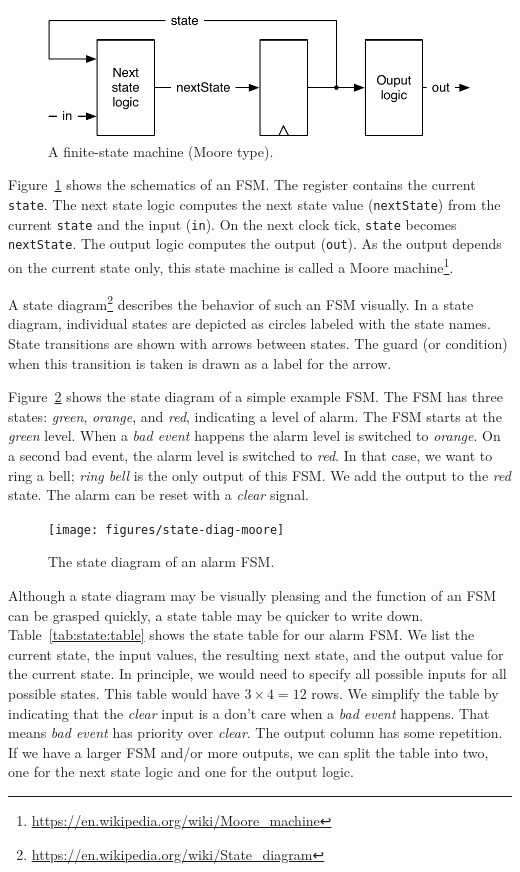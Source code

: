 \documentclass[%
    10pt,
    headinclude, footexclude,
    openright, %
    notitlepage,
    cleardoubleempty,
    headsepline,
    pointlessnumbers,
    bibtotoc, idxtotoc,
    ]{scrbook}
\newcommand{\code}[1]{{\small{\texttt{#1}}}}
\newcommand{\scale}{0.7}
\newcommand{\myref}[2]{\href{#1}{#2}}
\renewcommand{\myref}[2]{{#2}{\footnote{\url{#1}}}}
\begin{document}
\begin{figure}
  \centering
  \includegraphics[scale=\scale]{figures/fsm}
  \caption{A finite-state machine (Moore type).}
  \label{fig:fsm}
\end{figure}

Figure~\ref{fig:fsm} shows the schematics of an FSM. The register contains the current \code{state}.
The next state logic computes the next state value (\code{nextState})
from the current \code{state} and the input (\code{in}).
On the next clock tick, \code{state} becomes \code{nextState}.
The output logic computes the output (\code{out}). As the output depends on the current
state only, this state machine is called a
\myref{https://en.wikipedia.org/wiki/Moore_machine}{Moore machine}.


A \myref{https://en.wikipedia.org/wiki/State_diagram}{state diagram}
describes the behavior of such an FSM visually.
In a state diagram, individual states are depicted as circles labeled
with the state names.
State transitions are shown with arrows between states.
The guard (or condition) when this transition is taken is drawn as a label
for the arrow.

Figure~\ref{fig:diag-moore} shows the state diagram of a simple example FSM.
The FSM has three states: \emph{green}, \emph{orange}, and \emph{red},
indicating a level of alarm. The FSM starts at the \emph{green} level.
When a \emph{bad event} happens the alarm level is switched to \emph{orange}.
On a second bad event, the alarm level is switched to \emph{red}.
In that case, we want to ring a bell; \emph{ring bell} is the only output of this FSM.
We add the output to the \emph{red} state.
The alarm can be reset with a \emph{clear} signal.

\begin{figure}
  \centering
  \texttt{[image: figures/state-diag-moore]}
  \caption{The state diagram of an alarm FSM.}
  \label{fig:diag-moore}
\end{figure}

Although a state diagram may be visually pleasing and the function of an FSM
can be grasped quickly, a state table may be quicker to write down.
Table~\ref{tab:state:table} shows the state table for our alarm FSM.
We list the current state, the input values, the resulting next state, and
the output value for the current state. In principle, we would need to
specify all possible inputs for all possible states. This table would have
$3 \times 4 = 12$ rows. We simplify the table by indicating that the \emph{clear}
input is a don't care when a \emph{bad event} happens. That means
\emph{bad event} has priority over \emph{clear}. The output column
has some repetition. If we have a larger FSM and/or more outputs, we
can split the table into two, one for the next state logic and one for the
output logic.
\end{document}
